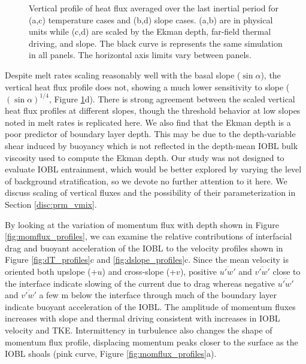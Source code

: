 \documentclass[draft]{agujournal2019}
\begin{document}
\begin{figure}[h!]
\begin{minipage}{0.5\textwidth}
    \end{minipage}
    \caption{Vertical profile of heat flux averaged over the last inertial period for (a,c) temperature cases and (b,d) slope cases. (a,b) are in physical units while (c,d) are scaled by the Ekman depth, far-field thermal driving, and slope. The black curve is represents the same simulation in all panels. The horizontal axis limits vary between panels.} 
    \label{fig:heatflux_profiles}
\end{figure}

Despite melt rates scaling reasonably well with the basal slope ($\sin \alpha$), the vertical heat flux profile does not, showing a much lower sensitivity to slope ($(\sin\alpha)^{1/4}$, Figure \ref{fig:heatflux_profiles}d). There is strong agreement between the scaled vertical heat flux profiles at different slopes, though the threshold behavior at low slopes noted in melt rates is replicated here. We also find that the Ekman depth is a poor predictor of boundary layer depth. This may be due to the depth-variable shear induced by buoyancy which is not reflected in the depth-mean IOBL bulk viscosity used to compute the Ekman depth. Our study was not designed to evaluate IOBL entrainment, which would be better explored by varying the level of background stratification, so we devote no further attention to it here. We discuss scaling of vertical fluxes and the possibility of their parameterization in Section \ref{disc:prm_vmix}.


By looking at the variation of momentum flux with depth shown in Figure \ref{fig:momflux_profiles}, we can examine the relative contributions of interfacial drag and buoyant acceleration of the IOBL to the velocity profiles shown in Figure \ref{fig:dT_profiles}c and \ref{fig:dslope_profiles}c. Since the mean velocity is oriented both upslope (+$u$) and cross-slope (+$v$), positive $\overline{u'w'}$ and $\overline{v'w'}$ close to the interface indicate slowing of the current due to drag whereas negative $\overline{u'w'}$ and $\overline{v'w'}$ a few m below the interface through much of the boundary layer indicate buoyant acceleration of the IOBL. The amplitude of momentum fluxes increases with slope and thermal driving consistent with increases in IOBL velocity and TKE. Intermittency in turbulence also changes the shape of momentum flux profile, displacing momentum peaks closer to the surface as the IOBL shoals (pink curve, Figure \ref{fig:momflux_profiles}a). 
\end{document}

